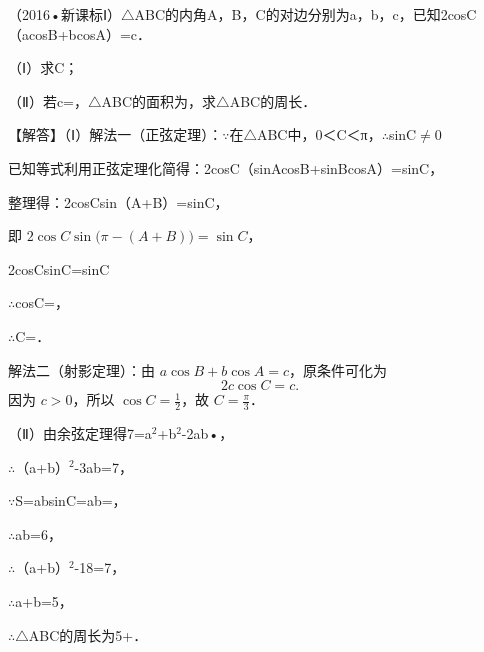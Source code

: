 \begin{question}
（2016•新课标Ⅰ）$\triangle$ABC的内角A，B，C的对边分别为a，b，c，已知2cosC（acosB+bcosA）=c．\par
（Ⅰ）求C；\par
（Ⅱ）若c=\allowbreak{}，$\triangle$ABC的面积为\allowbreak{}，求$\triangle$ABC的周长．\par
\begin{solution}
【解答】（Ⅰ）解法一（正弦定理）：$\because$在$\triangle$ABC中，0＜C＜π，$\therefore$sinC$\neq$0\par
已知等式利用正弦定理化简得：2cosC（sinAcosB+sinBcosA）=sinC，\par
整理得：2cosCsin（A+B）=sinC，\par
即 $2\cos C\sin\bigl(\pi-(A+B)\bigr)=\sin C$，\par
2cosCsinC=sinC\par
$\therefore$cosC=\allowbreak{}，\par
$\therefore$C=\allowbreak{}．\par
解法二（射影定理）：由 $a\cos B+b\cos A=c$，原条件可化为
\[
2c\cos C=c.
\]
因为 $c>0$，所以 $\cos C=\frac12$，故 $C=\frac\pi3$．\par
（Ⅱ）由余弦定理得7=a$^{2}$+b$^{2}$-2ab•\allowbreak{}，\par
$\therefore$（a+b）$^{2}$-3ab=7，\par
$\because$S=\allowbreak{}absinC=\allowbreak{}ab=\allowbreak{}，\par
$\therefore$ab=6，\par
$\therefore$（a+b）$^{2}$-18=7，\par
$\therefore$a+b=5，\par
$\therefore$$\triangle$ABC的周长为5+\allowbreak{}．\par
\end{solution}
\end{question}

